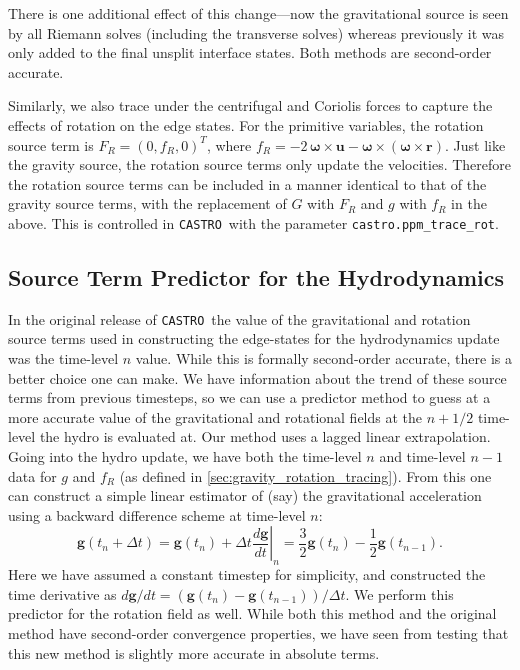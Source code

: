 \documentclass[iop]{../emulateapj}
\newcommand{\castro}{\texttt{CASTRO}}
\begin{document}
There is one additional effect of this change---now the gravitational
source is seen by all Riemann solves (including the transverse solves)
whereas previously it was only added to the final unsplit interface
states.  Both methods are second-order accurate.

Similarly, we also trace under the centrifugal and Coriolis forces to capture
the effects of rotation on the edge states. For the primitive variables, the rotation
source term is $F_R = (0, f_R, 0)^T$, where $f_R = -2\, {\bm{\omega}} \times \mathbf{u} - {\bm\omega}\times \left({\bm\omega} \times \mathbf{r}\right).$
Just like the gravity source, the rotation source terms only update the velocities. Therefore 
the rotation source terms can be included in a manner identical to that of the gravity source
terms, with the replacement of $G$ with $F_R$ and $g$ with $f_R$ in the above. This is controlled in \castro\
with the parameter {\tt castro.ppm\_trace\_rot}.



\subsection{Source Term Predictor for the Hydrodynamics}

In the original release of \castro\ the value of the gravitational and rotation
source terms used in constructing the edge-states for the hydrodynamics update
was the time-level $n$ value. While this is formally second-order accurate, there
is a better choice one can make. We have information about the trend of these
source terms from previous timesteps, so we can use a predictor method to guess
at a more accurate value of the gravitational and rotational fields at the
$n+1/2$ time-level the hydro is evaluated at. Our method uses a lagged linear
extrapolation. Going into the hydro update, we have both the time-level $n$ and
time-level $n-1$ data for $g$ and $f_R$ (as defined in \autoref{sec:gravity_rotation_tracing}).
From this one can construct a simple linear estimator of (say) the gravitational
acceleration using a backward difference scheme at time-level $n$:
\begin{equation}
  \mathbf{g}(t_n + \Delta t) = \mathbf{g}(t_n) + \Delta t \left.\frac{d\mathbf{g}}{dt}\right|_{n} = \frac{3}{2}\mathbf{g}(t_n) - \frac{1}{2}\mathbf{g}(t_{n-1}).
\end{equation}
Here we have assumed a constant timestep for simplicity, and constructed the time derivative as
$d\mathbf{g} / dt = (\mathbf{g}(t_n) - \mathbf{g}(t_{n-1})) / \Delta t$. We perform this
predictor for the rotation field as well. While both this method and the original
method have second-order convergence properties, we have seen from testing that
this new method is slightly more accurate in absolute terms.
\end{document}

